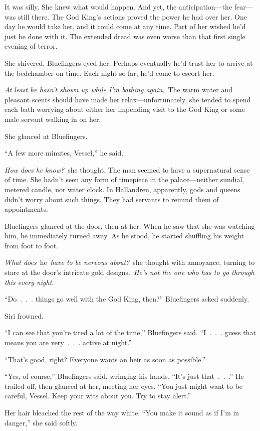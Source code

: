 It was silly. She knew what would happen. And yet, the anticipation—the fear—was still there. The God King’s actions proved the power he had over her. One day he would take her, and it could come at any time. Part of her wished he’d just be done with it. The extended dread was even worse than that first single evening of terror.

She shivered. Bluefingers eyed her. Perhaps eventually he’d trust her to arrive at the bedchamber on time. Each night so far, he’d come to escort her.

\textit{At least he hasn’t shown up while I’m bathing again.}~The warm water and pleasant scents should have made her relax—unfortunately, she tended to spend each bath worrying about either her impending visit to the God King or some male servant walking in on her.

She glanced at Bluefingers.

“A few more minutes, Vessel,” he said.

\textit{How does he know?}~she thought. The man seemed to have a supernatural sense of time. She hadn’t seen any form of timepiece in the palace—neither sundial, metered candle, nor water clock. In Hallandren, apparently, gods and queens didn’t worry about such things. They had servants to remind them of appointments.

Bluefingers glanced at the door, then at her. When he saw that she was watching him, he immediately turned away. As he stood, he started shuffling his weight from foot to foot.

\textit{What does}~he~\textit{have to be nervous about?}~she thought with annoyance, turning to stare at the door’s intricate gold designs.~\textit{He’s not the one who has to go through this every night.}

“Do~.~.~. things go well with the God King, then?” Bluefingers asked suddenly.

Siri frowned.

“I can see that you’re tired a lot of the time,” Bluefingers said. “I~.~.~. guess that means you are very~.~.~. active at night.”

“That’s good, right? Everyone wants an heir as soon as possible.”

“Yes, of course,” Bluefingers said, wringing his hands. “It’s just that~.~.~.” He trailed off, then glanced at her, meeting her eyes. “You just might want to be careful, Vessel. Keep your wits about you. Try to stay alert.”

Her hair bleached the rest of the way white. “You make it sound as if I’m in danger,” she said softly.


